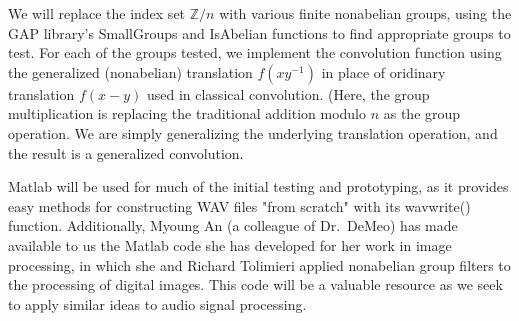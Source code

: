 \documentclass[10pt]{article}
\begin{document}
We will replace the index set $\mathbb{Z}/n$ with various finite nonabelian
groups, using the GAP library's SmallGroups and IsAbelian functions to find
appropriate groups to test. For each of the groups tested, we implement the
convolution function using the generalized (nonabelian) translation $f(xy^{-1})$
in place of oridinary translation $f(x-y)$ used in classical convolution. (Here,
the group multiplication is replacing the traditional addition modulo $n$ as the
group operation.  We are simply generalizing the underlying translation
operation, and the result is a generalized convolution.

Matlab will be used for much of the initial testing and prototyping, as it
provides easy methods for constructing WAV files "from scratch" with its
wavwrite() function. Additionally, Myoung An (a colleague of Dr.~DeMeo)
has made available to us the Matlab code she has developed for her work
in image processing, in which she and Richard Tolimieri applied nonabelian group
filters to the processing of digital images. This code will be a valuable
resource as we seek to apply similar ideas to audio signal processing.  
\end{document}

